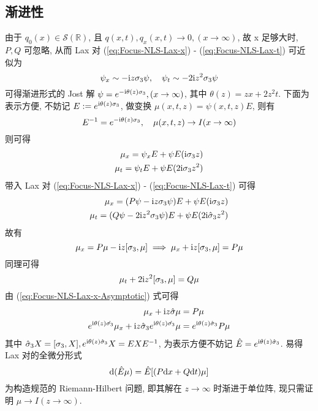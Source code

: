 \subsection{渐进性}

由于 $ q_{0}(x) \in \mathcal{S}(\mathbb{R}) $, 且 $ q(x,t), q_{x}(x,t) \to 0, (x \to \infty) $, 故 x 足够大时, $ P, Q $ 可忽略, 从而 Lax 对 (\ref{eq:Focus-NLS-Lax-x}) - (\ref{eq:Focus-NLS-Lax-t}) 可近似为
\begin{equation*}
  \psi_{x} \sim - \mathrm{i} z \sigma_{3} \psi, \quad \psi_{t} \sim - 2\mathrm{i} z^2 \sigma_{3} \psi
\end{equation*}
可得渐进形式的 Jost 解 $ \psi = e^{- \mathrm{i} \theta(z) \sigma_{3}}, (x \to \infty) $, 其中 $ \theta(z) = z x + 2z^2 t $. 下面为表示方便, 不妨记 $ E := e^{ \mathrm{i} \theta(z) \sigma_{3}} $, 做变换 $ \mu(x,t,z) = \psi(x,t,z)E $, 则有
\begin{equation}
  E^{-1} = e^{-\mathrm{i} \theta(z) \sigma_{3}}, \quad \mu(x,t,z) \to I( x \to \infty) \label{eq:mu-asymptomatic}
\end{equation}
则可得 
\begin{align}
  \mu_{x} = \psi_{x}E + \psi E (\mathrm{i} \sigma_{3} z) \\
  \mu_{t} = \psi_{t}E + \psi E (2 \mathrm{i} \sigma_{3} z^2)
\end{align}
带入 Lax 对 (\ref{eq:Focus-NLS-Lax-x}) - (\ref{eq:Focus-NLS-Lax-t}) 可得
\begin{align}
  \mu_{x} = (P \psi - \mathrm{i} z \sigma_{3} \psi)E + \psi E(\mathrm{i} \sigma_{3} z) \\
  \mu_{t} = (Q \psi - 2 \mathrm{i} z^2 \sigma_{3} \psi)E + \psi E (2 \mathrm{i} \hat{\sigma}_{3} z^2)
\end{align}
故有 
\begin{equation}
  \mu_{x} = P\mu -\mathrm{i} z [\sigma_{3}, \mu] \implies \mu_{x} + \mathrm{i} z [\sigma_{3}, \mu] = P \mu \label{eq:Focus-NLS-Lax-x-Asymptotic}
\end{equation}
同理可得
\begin{equation}
  \mu_{t} + 2 \mathrm{i} z^2 [\sigma_{3}, \mu] = Q \mu \label{eq:Focus-NLS-Lax-t-Asymptotic}
\end{equation}
由 (\ref{eq:Focus-NLS-Lax-x-Asymptotic}) 式可得
\begin{align}
  \mu_{x} + \mathrm{i} z \hat{\sigma} \mu &= P \mu \\
  e^{\mathrm{i} \theta(z) \hat{\sigma_{3}}} \mu_{x} + \mathrm{i} z \hat{\sigma}_{3} e^{\mathrm{i} \theta(z) \hat{\sigma_{3}}} \mu &= e^{\mathrm{i} \theta(z) \hat{\sigma}_{3}} P \mu
\end{align}
其中 $ \hat{\sigma}_{3}X = [\sigma_{3}, X], e^{\mathrm{i} \theta(z) \hat{\sigma}_{3}} X = E X E^{-1} $, 为表示方便不妨记 $ \hat{E} = e^{\mathrm{i} \theta(z) \hat{\sigma}_{3}} $. 
易得 Lax 对的全微分形式
\begin{equation}
  \mathrm{d} (\hat{E} \mu) = \hat{E} [ (P \mathrm{d} x + Q \mathrm{d} t) \mu ] \label{eq:diffision-mu}
\end{equation}
为构造规范的 Riemann-Hilbert 问题, 即其解在 $ z \to \infty $ 时渐进于单位阵, 现只需证明 $ \mu \to I (z \to \infty) $. 

